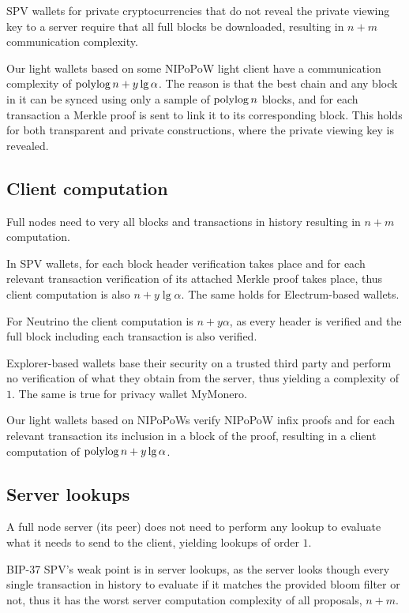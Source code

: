 SPV wallets for private cryptocurrencies that do not reveal the private viewing key to a server require that all full blocks be downloaded, resulting in $n+m$ communication complexity.

Our light wallets based on some NIPoPoW light client have a communication complexity of $\operatorname{polylog}{n} + y\lg{\alpha}$. The reason is that the best chain and any block in it can be synced using only a sample of $\operatorname{polylog}{n}$ blocks, and for each transaction a Merkle proof is sent to link it to its corresponding block. This holds for both transparent and private constructions, where the private viewing key is revealed.

\subsection{Client computation}
Full nodes need to very all blocks and transactions in history resulting in $n+m$ computation.

In SPV wallets, for each block header verification takes place and for each relevant transaction verification of its attached Merkle proof takes place, thus client computation is also $n+y\lg{\alpha}$. The same holds for Electrum-based wallets.

For Neutrino the client computation is $n+y\alpha$, as every header is verified and the full block including each transaction is also verified.

Explorer-based wallets base their security on a trusted third party and perform no verification of what they obtain from the server, thus yielding a complexity of $1$. The same is true for privacy wallet MyMonero.

Our light wallets based on NIPoPoWs verify NIPoPoW infix proofs and for each relevant transaction its inclusion in a block of the proof, resulting in a client computation of $\operatorname{polylog}{n} + y\lg{\alpha}$.

\subsection{Server lookups}

A full node server (its peer) does not need to perform any lookup to evaluate what it needs to send to the client, yielding lookups of order $1$.

BIP-37 SPV's weak point is in server lookups, as the server looks though every single transaction in history to evaluate if it matches the provided bloom filter or not, thus it has the worst server computation complexity of all proposals, $n+m$.

